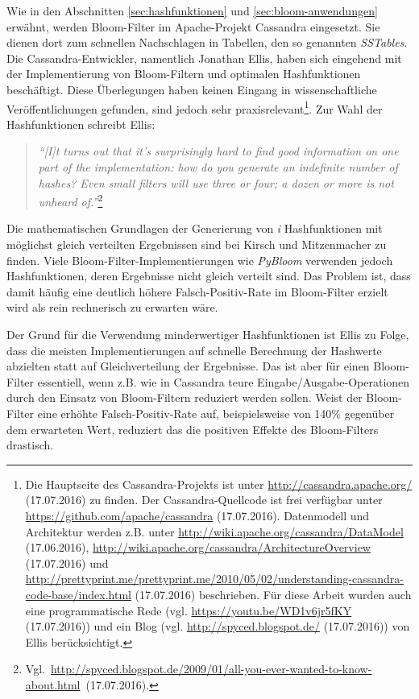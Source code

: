 Wie in den Abschnitten \ref{sec:hashfunktionen} und \ref{sec:bloom-anwendungen} erwähnt, werden Bloom-Filter im Apache-Projekt Cassandra eingesetzt. Sie dienen dort zum schnellen Nachschlagen in Tabellen, den so genannten \textit{SSTables}. Die Cassandra-Entwickler, namentlich Jonathan Ellis, haben sich eingehend mit der Implementierung von Bloom-Filtern und optimalen Hashfunktionen beschäftigt. Diese Überlegungen haben keinen Eingang in wissenschaftliche Veröffentlichungen gefunden, sind jedoch sehr praxisrelevant\footnote{Die Hauptseite des Cassandra-Projekts ist unter \url{http://cassandra.apache.org/} (17.07.2016) zu finden. Der Cassandra-Quellcode ist frei verfügbar unter \url{https://github.com/apache/cassandra} (17.07.2016). Datenmodell und Architektur werden z.B. unter \url{http://wiki.apache.org/cassandra/DataModel} (17.06.2016), \url{http://wiki.apache.org/cassandra/ArchitectureOverview} (17.07.2016) und \url{http://prettyprint.me/prettyprint.me/2010/05/02/understanding-cassandra-code-base/index.html} (17.07.2016) beschrieben. Für diese Arbeit wurden auch eine programmatische Rede (vgl. \url{https://youtu.be/WD1v6jr5fKY} (17.07.2016)) und ein Blog (vgl. \url{http://spyced.blogspot.de/} (17.07.2016)) von Ellis berücksichtigt.}. Zur Wahl der Hashfunktionen schreibt Ellis: 
\newpage
\begin{quote}
\textit{"`[I]t turns out that it's surprisingly hard to find good information on one part of the implementation: how do you generate an indefinite number of hashes? Even small filters will use three or four; a dozen or more is not unheard of."'}\footnote{\mbox{Vgl. \url{http://spyced.blogspot.de/2009/01/all-you-ever-wanted-to-know-about.html} (17.07.2016).}} 
\end{quote}
Die mathematischen Grundlagen der Generierung von \textit{i} Hashfunktionen mit möglichst gleich verteilten Ergebnissen sind bei Kirsch und Mitzenmacher \cite{Kirsch2006} zu finden. Viele Bloom-Filter-Implementierungen wie \textit{PyBloom} verwenden jedoch Hashfunktionen, deren Ergebnisse nicht gleich verteilt sind. Das Problem ist, dass damit häufig eine deutlich höhere Falsch-Positiv-Rate im Bloom-Filter erzielt wird als rein rechnerisch zu erwarten wäre. 

Der Grund für die Verwendung minderwertiger Hashfunktionen ist Ellis zu Folge, dass die meisten Implementierungen auf schnelle Berechnung der Hashwerte abzielten statt auf Gleichverteilung der Ergebnisse. Das ist aber für einen Bloom-Filter essentiell, wenn z.B. wie in Cassandra teure Eingabe/Ausgabe-Operationen durch den Einsatz von Bloom-Filtern reduziert werden sollen. Weist der Bloom-Filter eine erhöhte Falsch-Positiv-Rate auf, beispielsweise von 140\% gegenüber dem erwarteten Wert, reduziert das die positiven Effekte des Bloom-Filters drastisch.  

